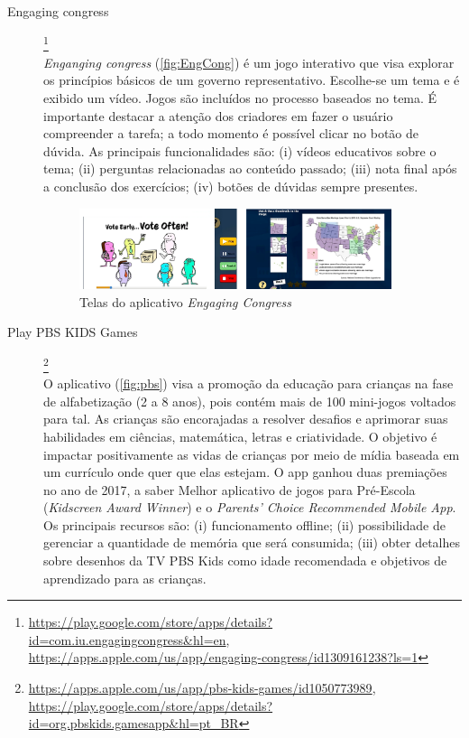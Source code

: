 \begin{description}

\item[Engaging congress]\footnote{\url{https://play.google.com/store/apps/details?id=com.iu.engagingcongress&hl=en}, \url{https://apps.apple.com/us/app/engaging-congress/id1309161238?ls=1}} \hfill \\
\textit{Enganging congress} (\autoref{fig:EngCong}) é um jogo interativo que visa explorar os princípios básicos de um governo representativo. Escolhe-se um tema e é exibido um vídeo. Jogos são incluídos no processo baseados no tema. É importante destacar a atenção dos criadores em fazer o usuário compreender a tarefa; a todo momento é possível clicar no botão de dúvida. As principais funcionalidades são: (i) vídeos educativos sobre o tema; (ii) perguntas relacionadas ao conteúdo passado; (iii) nota final após a conclusão dos exercícios; (iv) botões de dúvidas sempre presentes.

\begin{figure}[ht!]
\centering
    \includegraphics[width=0.9\textwidth]{Figuras/engagingcongress.png}
    \caption{Telas do aplicativo \textit{Engaging Congress}}
    \label{fig:EngCong}
\end{figure}

\item[Play PBS KIDS Games]\footnote{\url{https://apps.apple.com/us/app/pbs-kids-games/id1050773989}, \url{https://play.google.com/store/apps/details?id=org.pbskids.gamesapp&hl=pt_BR}} \hfill \\
O aplicativo (\autoref{fig:pbs}) visa a promoção da educação para crianças na fase de alfabetização (2 a 8 anos), pois contém mais de 100 mini-jogos voltados para tal. As crianças são encorajadas a resolver desafios e aprimorar suas habilidades em ciências, matemática, letras e criatividade. O objetivo é impactar positivamente as vidas de crianças por meio de mídia baseada em um currículo onde quer que elas estejam. O app ganhou duas premiações no ano de 2017, a saber Melhor aplicativo de jogos para Pré-Escola (\textit{Kidscreen Award Winner}) e o \textit{Parents' Choice Recommended Mobile App}. Os principais recursos são: (i) funcionamento offline; (ii) possibilidade de gerenciar a quantidade de memória que será consumida; (iii) obter detalhes sobre desenhos da TV PBS Kids como idade recomendada e objetivos de aprendizado para as crianças.


\end{description}
